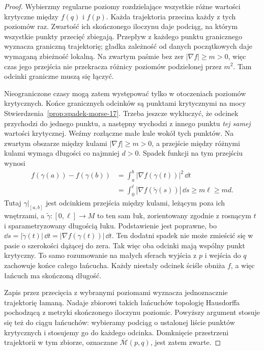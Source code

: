 \begin{proof}
Wybierzmy regularne poziomy rozdzielające wszystkie
różne wartości krytyczne między $f(q)$ i $f(p)$.
Każda trajektoria przecina każdy z tych poziomów raz.
Zwartość ich skończonego iloczynu daje podciąg,
na którym wszystkie punkty przecięć zbiegają.
Przepływ z każdego punktu granicznego wyznacza
graniczną trajektorię; gładka zależność od danych
początkowych daje wymaganą zbieżność lokalną.
Na zwartym paśmie bez zer $|\nabla f|\geq m>0$,
więc czas jego przejścia nie przekracza
różnicy poziomów podzielonej przez $m^2$.
Tam odcinki graniczne muszą się łączyć.

Nieograniczone czasy mogą zatem występować tylko
w otoczeniach poziomów krytycznych.
Końce granicznych odcinków są punktami krytycznymi
na mocy Stwierdzenia~\ref{prop:spadek-morse-17}.
Trzeba jeszcze wykluczyć, że odcinek przychodzi do
jednego punktu, a następny wychodzi z innego punktu
\emph{tej samej} wartości krytycznej.
Weźmy rozłączne małe kule wokół tych punktów.
Na zwartym obszarze między kulami $|\nabla f|\geq m>0$,
a przejście między różnymi kulami wymaga długości
co najmniej $d>0$. Spadek funkcji na tym przejściu wynosi
\[
 \begin{aligned}
 f(\gamma(a))-f(\gamma(b))
 &=\int_a^b|\nabla f(\gamma(t))|^2\,\dd t\\
 &=\int_0^\ell|\nabla f(\widetilde\gamma(s))|\,\dd s
 \geq m\ell\geq md.
 \end{aligned}
\]
Tutaj $\gamma|_{[a,b]}$ jest odcinkiem przejścia między kulami,
leżącym poza ich wnętrzami, a $\widetilde\gamma:[0,\ell]\to M$
to ten sam łuk, zorientowany zgodnie z rosnącym $t$
i sparametryzowany długością łuku.
Podstawienie jest poprawne, bo
$\dd s=|\dot\gamma(t)|\,\dd t=|\nabla f(\gamma(t))|\,\dd t$.
Ten dodatni spadek nie może zmieścić się
w pasie o szerokości dążącej do zera.
Tak więc oba odcinki mają wspólny punkt krytyczny.
To samo rozumowanie na małych sferach wyjścia
z $p$ i wejścia do $q$ zachowuje końce całego łańcucha.
Każdy niestały odcinek ściśle obniża $f$,
a więc łańcuch ma skończoną długość.

Zapis przez przecięcia z wybranymi poziomami
wyznacza jednoznacznie trajektorię łamaną.
Nadaje zbiorowi takich łańcuchów topologię Hausdorffa
pochodzącą z metryki skończonego iloczynu poziomic.
Powyższy argument stosuje się też do ciągu łańcuchów:
wybieramy podciąg o ustalonej liście punktów
krytycznych i stosujemy go do każdego odcinka.
Domknięcie przestrzeni trajektorii w tym zbiorze,
oznaczane $\overline{\mathcal M}(p,q)$, jest zatem zwarte.
\end{proof}


